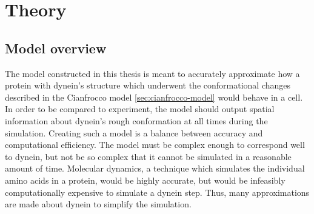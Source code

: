 \documentclass[
11pt, %
english, %
singlespacing, %
headsepline, %
chapterinoneline, %
]{MastersDoctoralThesis} %
\begin{document}

\newpage
\chapter{Theory}
\label{chap:Theory}

\section{Model overview}
The model constructed in this thesis is meant to accurately approximate how a protein with dynein's structure which underwent the conformational changes described in the Cianfrocco model \ref{sec:cianfrocco-model} would behave in a cell. In order to be compared to experiment, the model should output spatial information about dynein's rough conformation at all times during the simulation. Creating such a model is a balance between accuracy and computational efficiency. The model must be complex enough to correspond well to dynein, but not be so complex that it cannot be simulated in a reasonable amount of time. Molecular dynamics, a technique which simulates the individual amino acids in a protein, would be highly accurate, but would be infeasibly computationally expensive to simulate a dynein step. Thus, many approximations are made about dynein to simplify the simulation.\\
\end{document}
